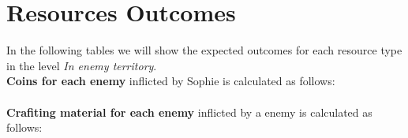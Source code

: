 \section{Resources Outcomes}
In the following tables we will show the expected outcomes for each resource type in the level \textit{In enemy territory}. \\
\textbf{Coins for each enemy} inflicted by Sophie is calculated as follows:\\\\
\textbf{Crafiting material for each enemy} inflicted by a enemy is calculated as follows:\\\\
